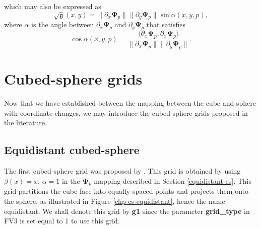 which may also be expressed as
\begin{equation}
	\label{mt-sina}
	\sqrt{\mathfrak{g}}(x,y) =	
\|\partial_x  \boldsymbol{\Psi}_p \| \|\partial_y  \boldsymbol{\Psi}_p \| \sin \alpha(x,y,p),
\end{equation}
where $\alpha$ is the angle between $\partial_x \boldsymbol{\Psi}_p$ and $\partial_y \boldsymbol{\Psi}_p$ that
satisfies
\begin{equation*}
	\label{mt-cosa}
\cos{\alpha(x,y,p)} = \frac{\langle  {\partial_x  \boldsymbol{\Psi}_p}, {\partial_x \boldsymbol{\Psi}_p} \rangle }
{\|\partial_x \boldsymbol{\Psi}_p\|  \|\partial_y \boldsymbol{\Psi}_p\|}.
\end{equation*}

\newpage
\section{Cubed-sphere grids}
\label{sec-cs-grids}
Now that we have established between the mapping between the cube and sphere with coordinate changes,
we may introduce the cubed-sphere grids proposed in the literature.

\subsection{Equidistant cubed-sphere}
\label{cs-equidistant}
The first cubed-sphere grid was proposed by \citet{sadourny:1972}. This grid is obtained by using
$\beta(x) = x$, $\alpha=1$ in the $\boldsymbol{\Psi}_p$ mapping described in Section \ref{equidistant-cs}.
This grid partitions the cube face into equally spaced points
and projects them onto the sphere, as illustrated in Figure
\ref{chp-cs-equidistant}, hence the name equidistant.
We shall denote this grid by \textbf{g1} since the parameter
\textbf{grid\_type} in FV3 is set equal to 1 to use this grid.

